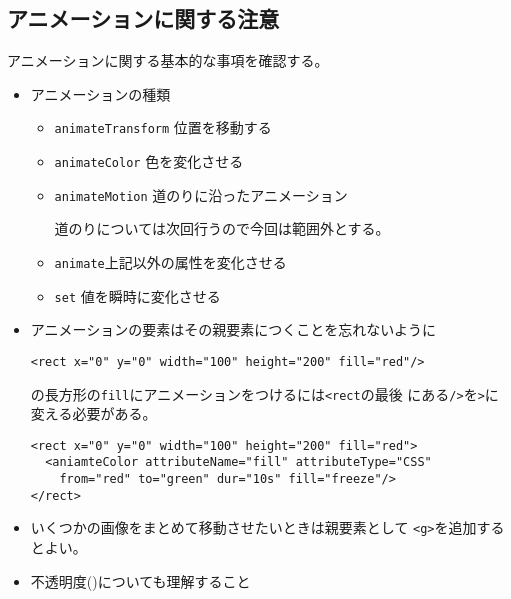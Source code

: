 \documentclass[a4j]{jarticle}
\begin{document}
\subsection{アニメーションに関する注意}
アニメーションに関する基本的な事項を確認する。
\begin{itemize}
 \item アニメーションの種類
\begin{itemize}
 \item \texttt{animateTransform} 位置を移動する
 \item \texttt{animateColor} 色を変化させる
 \item \texttt{animateMotion} 道のりに沿ったアニメーション
 
道のりについては次回行うので今回は範囲外とする。
 \item \texttt{animate}上記以外の属性を変化させる
 \item \texttt{set} 値を瞬時に変化させる
\end{itemize}
 \item アニメーションの要素はその親要素につくことを忘れないように
\begin{verbatim}
<rect x="0" y="0" width="100" height="200" fill="red"/>
\end{verbatim}
の長方形の\texttt{fill}にアニメーションをつけるには\texttt{<rect}の最後
       にある\texttt{/>}を\texttt{>}に変える必要がある。
\begin{Verbatim}
<rect x="0" y="0" width="100" height="200" fill="red">
  <aniamteColor attributeName="fill" attributeType="CSS" 
    from="red" to="green" dur="10s" fill="freeze"/>
</rect>
\end{Verbatim}
 \item いくつかの画像をまとめて移動させたいときは親要素として
       \texttt{<g>}を追加するとよい。
 \item 不透明度()についても理解すること
\end{itemize}
\end{document}
